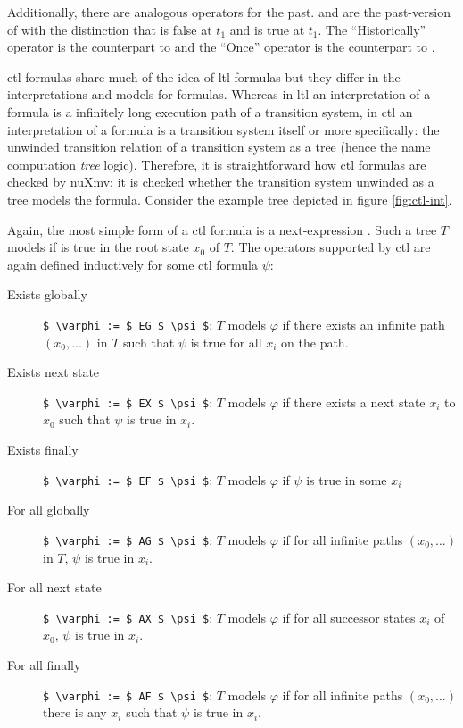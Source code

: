 Additionally, there are analogous operators for the past.
 and  are the past-version of  with the distinction that  is false at $ t_1 $ and  is true at $ t_1 $.
The \enquote{Historically} operator  is the counterpart to  and the \enquote{Once} operator  is the counterpart to .

\gls{ctl} formulas share much of the idea of \gls{ltl} formulas but they differ in the interpretations and models for formulas.
Whereas in \gls{ltl} an interpretation of a formula is a infinitely long execution path of a transition system, in \gls{ctl} an interpretation of a formula is a transition system itself or more specifically: the unwinded transition relation of a transition system as a tree (hence the name computation \textit{tree} logic).
Therefore, it is straightforward how \gls{ctl} formulas are checked by nuXmv: it is checked whether the transition system unwinded as a tree models the formula.
Consider the example tree depicted in figure \ref{fig:ctl-int}.

Again, the most simple form of a \gls{ctl} formula is a next-expression .
Such a tree $ T $ models  if  is true in the root state $ x_0 $ of $ T $.
The operators supported by \gls{ctl} are again defined inductively for some \gls{ctl} formula $ \psi $:
\begin{description}
    \item[Exists globally] \lstinline[language=smv,mathescape=true]{$ \varphi := $ EG $ \psi $}: $ T $ models $ \varphi $ if there exists an infinite path $ (x_0, \dots) $ in $ T $ such that $ \psi $ is true for all $ x_i $ on the path.
    \item[Exists next state] \lstinline[language=smv,mathescape=true]{$ \varphi := $ EX $ \psi $}: $ T $ models $ \varphi $ if there exists a next state $ x_i $ to $ x_0 $ such that $ \psi $ is true in $ x_i $.
    \item[Exists finally] \lstinline[language=smv,mathescape=true]{$ \varphi := $ EF $ \psi $}: $ T $ models $ \varphi $ if $ \psi $ is true in some $ x_i $
    \item[For all globally] \lstinline[language=smv,mathescape=true]{$ \varphi := $ AG $ \psi $}: $ T $ models $ \varphi $ if for all infinite paths $ (x_0, \dots) $ in $ T $, $ \psi $ is true in $ x_i $.
    \item[For all next state] \lstinline[language=smv,mathescape=true]{$ \varphi := $ AX $ \psi $}: $ T $ models $ \varphi $ if for all successor states $ x_i $ of $ x_0 $, $ \psi $ is true in $ x_i $.
    \item[For all finally] \lstinline[language=smv,mathescape=true]{$ \varphi := $ AF $ \psi $}: $ T $ models $ \varphi $ if for all infinite paths $ (x_0, \dots) $ there is any $ x_i $ such that $ \psi $ is true in $ x_i $.
\end{description}

